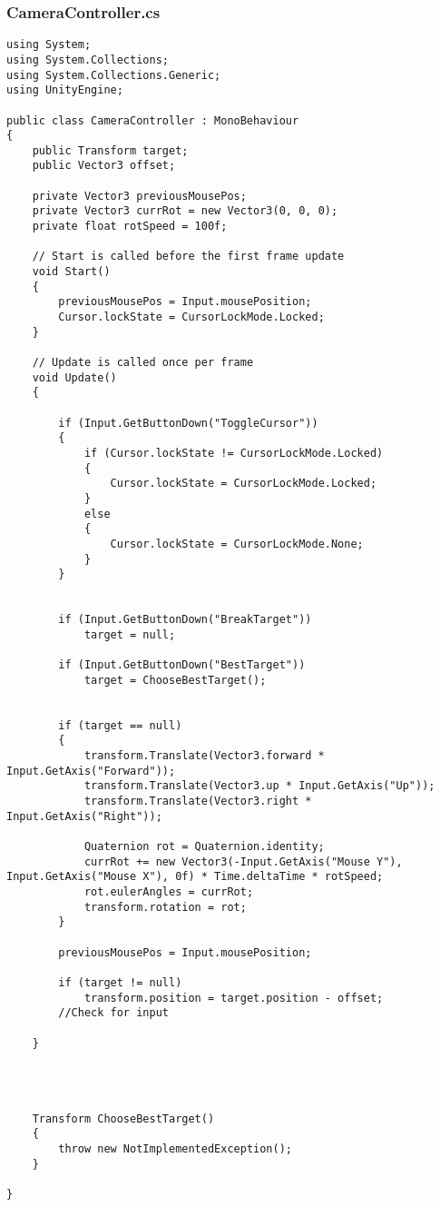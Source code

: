 \documentclass[12pt,a4paper]{article}
\begin{document}
\subsubsection*{CameraController.cs}
\begin{lstlisting}
using System;
using System.Collections;
using System.Collections.Generic;
using UnityEngine;

public class CameraController : MonoBehaviour
{
    public Transform target;
    public Vector3 offset;

    private Vector3 previousMousePos;
    private Vector3 currRot = new Vector3(0, 0, 0);
    private float rotSpeed = 100f;

    // Start is called before the first frame update
    void Start()
    {
        previousMousePos = Input.mousePosition;
        Cursor.lockState = CursorLockMode.Locked;
    }

    // Update is called once per frame
    void Update()
    {

        if (Input.GetButtonDown("ToggleCursor"))
        {
            if (Cursor.lockState != CursorLockMode.Locked)
            {
                Cursor.lockState = CursorLockMode.Locked;
            }
            else
            {
                Cursor.lockState = CursorLockMode.None;
            }
        }


        if (Input.GetButtonDown("BreakTarget"))
            target = null;

        if (Input.GetButtonDown("BestTarget"))
            target = ChooseBestTarget();


        if (target == null)
        {
            transform.Translate(Vector3.forward * Input.GetAxis("Forward"));
            transform.Translate(Vector3.up * Input.GetAxis("Up"));
            transform.Translate(Vector3.right * Input.GetAxis("Right"));

            Quaternion rot = Quaternion.identity;
            currRot += new Vector3(-Input.GetAxis("Mouse Y"), Input.GetAxis("Mouse X"), 0f) * Time.deltaTime * rotSpeed;
            rot.eulerAngles = currRot;
            transform.rotation = rot;
        }

        previousMousePos = Input.mousePosition;

        if (target != null)
            transform.position = target.position - offset;
        //Check for input

    }




    Transform ChooseBestTarget()
    {
        throw new NotImplementedException();
    }

}
\end{lstlisting}
\pagebreak
\end{document}
